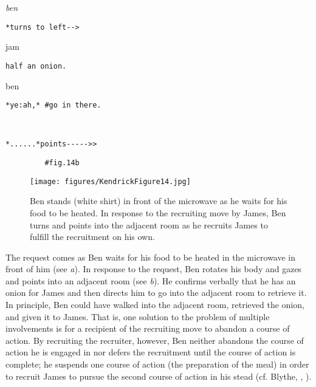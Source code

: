 \documentclass[output=paper,nonflat,modfont,draft]{langsci/langscibook}
\begin{document}

\begin{transbox}{4}{\textit{ben}}
\begin{verbatim}
*turns to left-->
\end{verbatim}
\end{transbox}

\begin{transbox}{5}{jam}
\begin{verbatim}
half an onion.
\end{verbatim}
\end{transbox}

\begin{transbox}{6}{ben}
\begin{verbatim}
*ye:ah,* #go in there.
\end{verbatim}
\end{transbox}

\begin{transbox}{7}{~}
\begin{verbatim}
*......*points----->>
\end{verbatim}
\end{transbox}

\begin{transbox}{8}{\fig}
\begin{verbatim}
         #fig.14b
\end{verbatim}
\end{transbox}\bigskip

\begin{figure}
\caption{Ben stands (white shirt) in front of the microwave as he waits for his food to be heated. In response to the recruiting move by James, Ben turns and points into the adjacent room as he recruits James to fulfill the recruitment on his own.}
\texttt{[image: figures/KendrickFigure14.jpg]}
\label{fig:kendrick:14}
\end{figure}

The request comes as Ben waits for his food to be heated in the microwave in front of him (see \textit{a}). In response to the request, Ben rotates his body and gazes and points into an adjacent room (see \textit{b}). He confirms verbally that he has an onion for James and then directs him to go into the adjacent room to retrieve it. In principle, Ben could have walked into the adjacent room, retrieved the onion, and given it to James. That is, one solution to the problem of multiple involvements is for a recipient of the recruiting move to abandon a course of action. By recruiting the recruiter, however, Ben neither abandons the course of action he is engaged in nor defers the recruitment until the course of action is complete; he suspends one course of action (the preparation of the meal) in order to recruit James to pursue the second course of action in his stead (cf. Blythe, , ).
\end{document}
